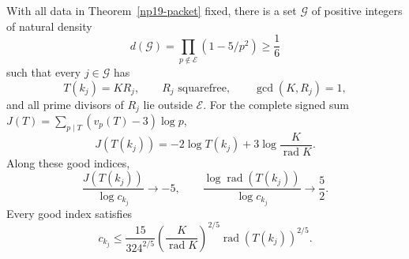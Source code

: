 \begin{theorem}
\label{np19-density}
With all data in Theorem~\ref{np19-packet} fixed, there is a set
\(\mathcal G\) of positive integers of natural density
\[
 d(\mathcal G)=\prod_{p\notin\mathcal E}(1-5/p^2)\ge\frac16
\]
such that every \(j\in\mathcal G\) has
\[
 T(k_j)=KR_j,\qquad R_j\text{ squarefree},\qquad
 \gcd(K,R_j)=1,
\]
and all prime divisors of \(R_j\) lie outside \(\mathcal E\).
For the complete signed sum \(J(T)=\sum_{p\mid T}(v_p(T)-3)\log p\),
\begin{equation}
 J(T(k_j))=-2\log T(k_j)+3\log\frac K{\operatorname{rad}K}.
 \label{np19-signed}
\end{equation}
Along these good indices,
\[
 \frac{J(T(k_j))}{\log c_{k_j}}\longrightarrow-5,\qquad
 \frac{\log\operatorname{rad}(T(k_j))}{\log c_{k_j}}
 \longrightarrow\frac52.
\]
Every good index satisfies
\begin{equation}
 c_{k_j}\le
 \frac{15}{324^{2/5}}
 \left(\frac K{\operatorname{rad}K}\right)^{2/5}
 \operatorname{rad}(T(k_j))^{2/5}.
 \label{np19-radical}
\end{equation}
\end{theorem}
